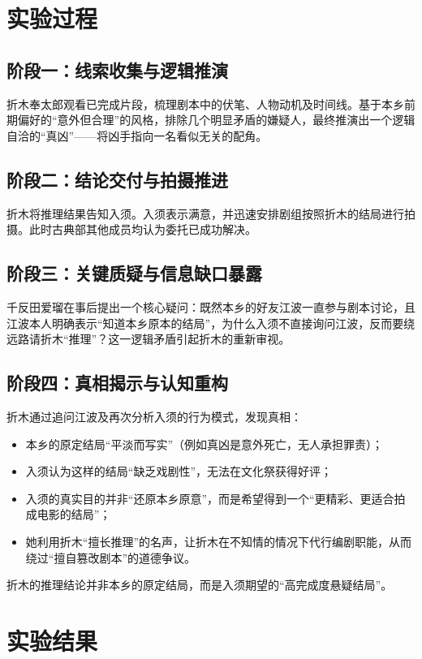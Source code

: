 \documentclass[a3paper, twocolumn]{article}
\begin{document}
\section{实验过程}
\subsection{阶段一：线索收集与逻辑推演}
折木奉太郎观看已完成片段，梳理剧本中的伏笔、人物动机及时间线。基于本乡前期偏好的“意外但合理”的风格，排除几个明显矛盾的嫌疑人，最终推演出一个逻辑自洽的“真凶”——将凶手指向一名看似无关的配角。

\subsection{阶段二：结论交付与拍摄推进}
折木将推理结果告知入须。入须表示满意，并迅速安排剧组按照折木的结局进行拍摄。此时古典部其他成员均认为委托已成功解决。

\subsection{阶段三：关键质疑与信息缺口暴露}
千反田爱瑠在事后提出一个核心疑问：既然本乡的好友江波一直参与剧本讨论，且江波本人明确表示“知道本乡原本的结局”，为什么入须不直接询问江波，反而要绕远路请折木“推理”？这一逻辑矛盾引起折木的重新审视。

\subsection{阶段四：真相揭示与认知重构}
折木通过追问江波及再次分析入须的行为模式，发现真相：
\begin{itemize}
    \item 本乡的原定结局“平淡而写实”（例如真凶是意外死亡，无人承担罪责）；
    \item 入须认为这样的结局“缺乏戏剧性”，无法在文化祭获得好评；
    \item 入须的真实目的并非“还原本乡原意”，而是希望得到一个“更精彩、更适合拍成电影的结局”；
    \item 她利用折木“擅长推理”的名声，让折木在不知情的情况下代行编剧职能，从而绕过“擅自篡改剧本”的道德争议。
\end{itemize}
折木的推理结论并非本乡的原定结局，而是入须期望的“高完成度悬疑结局”。

\section{实验结果}
\end{document}
